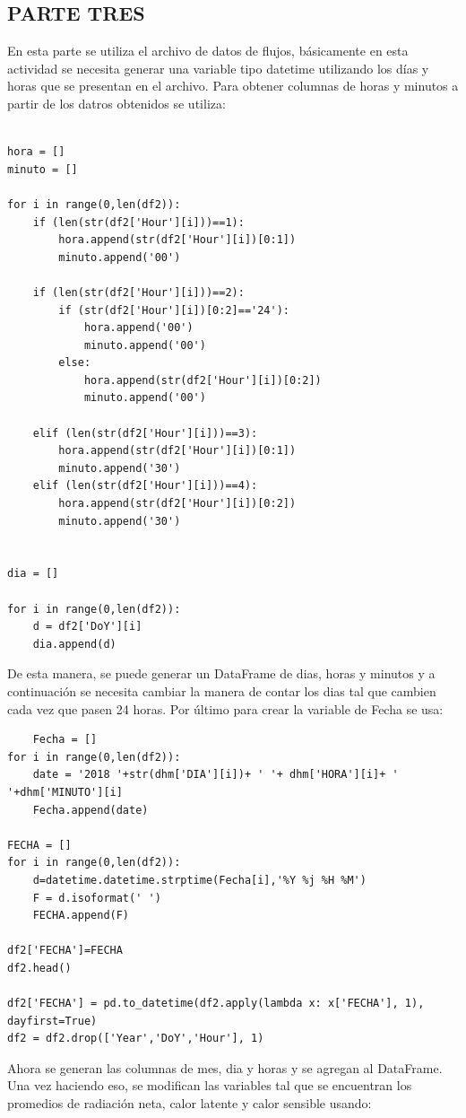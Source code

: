 \documentclass[11pt, spanish]{report}
\begin{document}
\subsection{PARTE TRES}
En esta parte se utiliza el archivo de datos de flujos, básicamente en esta actividad se necesita generar una variable tipo datetime utilizando los días y horas que se presentan en el archivo. Para obtener columnas de horas y minutos a partir de los datros obtenidos se utiliza:
\begin{verbatim}
    
hora = []
minuto = []

for i in range(0,len(df2)):
    if (len(str(df2['Hour'][i]))==1):
        hora.append(str(df2['Hour'][i])[0:1])
        minuto.append('00')
        
    if (len(str(df2['Hour'][i]))==2):
        if (str(df2['Hour'][i])[0:2]=='24'):
            hora.append('00')
            minuto.append('00')
        else:
            hora.append(str(df2['Hour'][i])[0:2])
            minuto.append('00')
            
    elif (len(str(df2['Hour'][i]))==3):
        hora.append(str(df2['Hour'][i])[0:1])
        minuto.append('30')
    elif (len(str(df2['Hour'][i]))==4):
        hora.append(str(df2['Hour'][i])[0:2])
        minuto.append('30')
      
      
dia = []

for i in range(0,len(df2)):
    d = df2['DoY'][i]
    dia.append(d)
\end{verbatim}
De esta manera,  se puede generar un DataFrame de dias, horas y minutos y a continuación se necesita cambiar la manera de contar los dias tal que cambien cada vez que pasen 24 horas. Por último para crear la variable de Fecha se usa:
\begin{verbatim}
    Fecha = []
for i in range(0,len(df2)):
    date = '2018 '+str(dhm['DIA'][i])+ ' '+ dhm['HORA'][i]+ ' '+dhm['MINUTO'][i]
    Fecha.append(date)

FECHA = []
for i in range(0,len(df2)):
    d=datetime.datetime.strptime(Fecha[i],'%Y %j %H %M')
    F = d.isoformat(' ')
    FECHA.append(F)
    
df2['FECHA']=FECHA
df2.head()

df2['FECHA'] = pd.to_datetime(df2.apply(lambda x: x['FECHA'], 1), dayfirst=True)
df2 = df2.drop(['Year','DoY','Hour'], 1)
\end{verbatim}
Ahora se generan las columnas de mes, dia y horas y se agregan al DataFrame. Una vez haciendo eso, se modifican las variables tal que se encuentran los promedios de radiación neta, calor latente y calor sensible usando:
\end{document}
